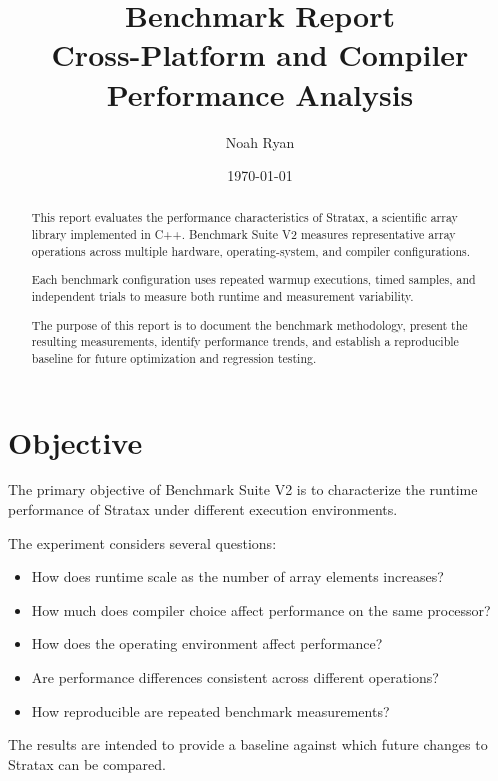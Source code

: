 \documentclass[11pt]{article}
\title{
    \textbf{\project{} \benchmarkversion{} Benchmark Report}\\
    \large Cross-Platform and Compiler Performance Analysis
}
\author{Noah Ryan}
\date{\today}
\newcommand{\project}{Stratax}
\newcommand{\benchmarkversion}{V2}
\begin{document}
\maketitle


\begin{abstract}

This report evaluates the performance characteristics of
\project{}, a scientific array library implemented in C++.
Benchmark Suite \benchmarkversion{} measures representative
array operations across multiple hardware, operating-system,
and compiler configurations.

Each benchmark configuration uses repeated warmup executions,
timed samples, and independent trials to measure both runtime
and measurement variability.

The purpose of this report is to document the benchmark
methodology, present the resulting measurements, identify
performance trends, and establish a reproducible baseline for
future optimization and regression testing.

\end{abstract}


\section{Objective}

The primary objective of Benchmark Suite \benchmarkversion{}
is to characterize the runtime performance of \project{} under
different execution environments.

The experiment considers several questions:

\begin{itemize}
    \item How does runtime scale as the number of array elements increases?
    \item How much does compiler choice affect performance on the same processor?
    \item How does the operating environment affect performance?
    \item Are performance differences consistent across different operations?
    \item How reproducible are repeated benchmark measurements?
\end{itemize}

The results are intended to provide a baseline against which
future changes to \project{} can be compared.
\end{document}
